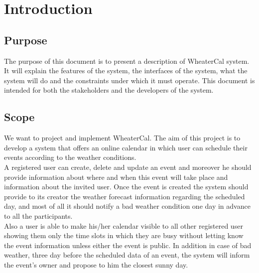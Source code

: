 \chapter{Introduction} \label{cap:cap1}

\section{Purpose}
The purpose of this document is to present a description of WheaterCal system. It will explain the features of the system, the interfaces of the system, what the system will do and the constraints under which it must operate.
This document is intended for both the stakeholders and the developers of the system.

\section{Scope}
We want to project and implement WheaterCal. The aim of this project is to develop a system that offers an online calendar in which user can schedule their events according to the weather conditions.\\ A registered user can create, delete and update an event and moreover he should provide information about where and when this event will take place and information about the invited user.
Once the event is created the system should provide to its creator the weather forecast information regarding the scheduled day, and most of all it should notify a bad weather condition one day in advance to all the participants.\\
Also a user is able to make his/her calendar visible to all other registered user showing them only the time slots in which they are busy without letting know the event information unless either the event is public.
In addition in case of bad weather, three day before the scheduled data of an event, the system will inform the event's owner and propose to him the closest sunny day.

